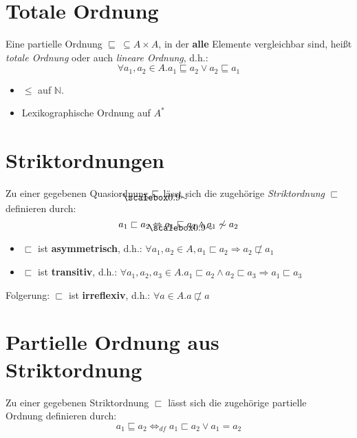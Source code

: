 \documentclass{article}
\begin{document}
\section*{Totale Ordnung}
\begin{defBox}
	Eine partielle Ordnung $\sqsubseteq\ \subseteq A \times A$,
	in der \textbf{alle} Elemente vergleichbar sind,
	heißt \textit{totale Ordnung} oder auch \textit{lineare Ordnung}, d.h.:
	\[
		\forall a_1, a_2 \in A. a_1 \sqsubseteq a_2 \lor a_2 \sqsubseteq a_1
	\]
\end{defBox}
\begin{exampleBox}
	\begin{itemize}[label=]
		\item $\leq$ auf $\mathbb{N}$.
		\item Lexikographische Ordnung auf $A^{*}$
	\end{itemize}
\end{exampleBox}

\section*{Striktordnungen}
\begin{defBox}[Striktordnungen]
	Zu einer gegebenen Quasiordnung $\sqsubsetsim$
	lässt sich die zugehörige \textit{Striktordnung}
	$\sqsubset$ definieren durch:
	\[
		a_1 \sqsubset a_2 \Leftrightarrow a_1 \sqsubsetsim a_2 \land a_1 \not \sim a_2
	\]
\end{defBox}
\begin{lemmaBox}[5.1]
	\begin{itemize}[label=]
		\item $\sqsubset$ ist \textbf{asymmetrisch}, d.h.: {\color{colCornYellow} $\forall a_1, a_2 \in A, a_1 \sqsubset a_2 \Rightarrow a_2 \not \sqsubset a_1$}
		\item $\sqsubset$ ist \textbf{transitiv}, d.h.: {\color{colCornYellow} $\forall a_1, a_2, a_3 \in A. a_1 \sqsubset a_2 \land a_2 \sqsubset a_3 \Rightarrow a_1 \sqsubset a_3$}
	\end{itemize}
\end{lemmaBox}
Folgerung: $\sqsubset$ ist \textbf{irreflexiv}, d.h.: $\forall a \in A. a \not \sqsubset a$

\section*{Partielle Ordnung aus Striktordnung}
\begin{defBox}
	Zu einer gegebenen Striktordnung $\sqsubset$ lässt
	sich die zugehörige partielle \\
	Ordnung definieren durch:
	\[
		a_1 \sqsubseteq a_2 \Leftrightarrow_{df} a_1 \sqsubset a_2 \lor a_1 = a_2
	\]
\end{defBox}
\end{document}
